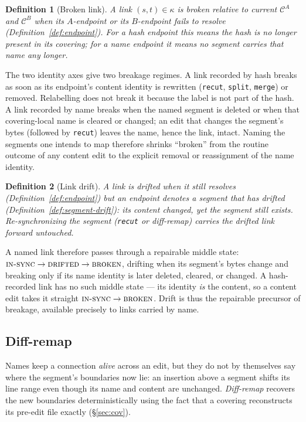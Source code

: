 \documentclass[11pt,a4paper]{article}
\newtheorem{definition}{Definition}[section]
\newcommand{\Cov}{\mathcal{C}}
\begin{document}
\begin{definition}[Broken link]\label{def:broken}
A link $(s, t) \in \kappa$ is \emph{broken} relative to current
$\Cov^A$ and $\Cov^B$ when its $A$-endpoint or its $B$-endpoint fails
to resolve (Definition~\ref{def:endpoint}). For a \emph{hash} endpoint this means
the hash is no longer present in its covering; for a \emph{name}
endpoint it means no segment carries that name any longer.
\end{definition}

The two identity axes give two breakage regimes. A link recorded by
hash breaks as soon as its endpoint's content identity is rewritten
(\texttt{recut}, \texttt{split}, \texttt{merge}) or removed. Relabelling
does not break it because the label is not part of the hash. A link
recorded by name breaks
when the named segment is deleted or when that covering-local name is
cleared or changed; an edit that changes the segment's bytes (followed by
\texttt{recut}) leaves the name, hence the link, intact. Naming the segments
one intends to map therefore shrinks ``broken'' from the routine outcome of
any content edit to the explicit removal or reassignment of the name
identity.

\begin{definition}[Link drift]\label{def:link-drift}
A link is \emph{drifted} when it still resolves
(Definition~\ref{def:endpoint}) but an endpoint denotes a segment that has
drifted (Definition~\ref{def:segment-drift}): its content changed, yet the
segment still exists. Re-synchronizing the segment (\texttt{recut} or
diff-remap) carries the drifted link forward untouched.
\end{definition}

A named link therefore passes through a repairable middle state:
$\textsc{in-sync} \to \textsc{drifted} \to \textsc{broken}$, drifting when
its segment's bytes change and breaking only if its name identity is later
deleted, cleared, or changed. A hash-recorded link has no such middle state — its identity
\emph{is} the content, so a content edit takes it straight
$\textsc{in-sync} \to \textsc{broken}$. Drift is thus the repairable
precursor of breakage, available precisely to links carried by name.

\subsection{Diff-remap}\label{sec:diffremap}

Names keep a connection \emph{alive} across an edit, but they do not by
themselves say where the segment's boundaries now lie: an insertion
above a segment shifts its line range even though its name and content
are unchanged. \emph{Diff-remap} recovers the new boundaries
deterministically using the fact that a covering reconstructs its
pre-edit file exactly (\S\ref{sec:cov}).
\end{document}

